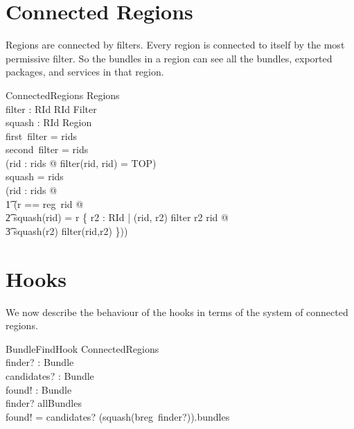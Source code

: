 \documentclass[a4paper,9pt]{article}
\begin{document}
\clearpage
\section{Connected Regions}
\label{cha:connregions}

Regions are connected by filters.
Every region is connected to itself by the most permissive filter.
So the bundles in a region can see all the bundles, exported packages, and services in that region.
\begin{schema}{ConnectedRegions}
  Regions \\
  filter : RId \cross RId \pfun Filter \\
  squash : RId \pfun Region \\
\where
  first~\limg \dom filter \rimg = rids \\
  second~\limg \dom filter \rimg = rids \\
  (\forall rid : rids @ filter(rid, rid) = TOP) \\
  \dom squash = rids \\
  (\forall rid : rids @ \\
\t1 (\LET r == reg~rid @ \\
\t2 squash(rid) = r \sqcup \bigsqcup \{ r2 : RId | (rid, r2) \in \dom filter \land r2 \neq rid @ \\
\t3 squash(r2) \wr filter(rid,r2) \}))\\
\end{schema}

\clearpage
\section{Hooks}
\label{cha:hooks}

We now describe the behaviour of the hooks in terms of the system of connected regions.

\begin{schema}{BundleFindHook}
  \Xi ConnectedRegions \\
  finder? : Bundle \\
  candidates? : \power Bundle \\
  found! : \power Bundle \\
\where
  finder? \in allBundles \\
  found! = candidates? \cap (squash(breg~finder?)).bundles \\
\end{schema}
\end{document}
